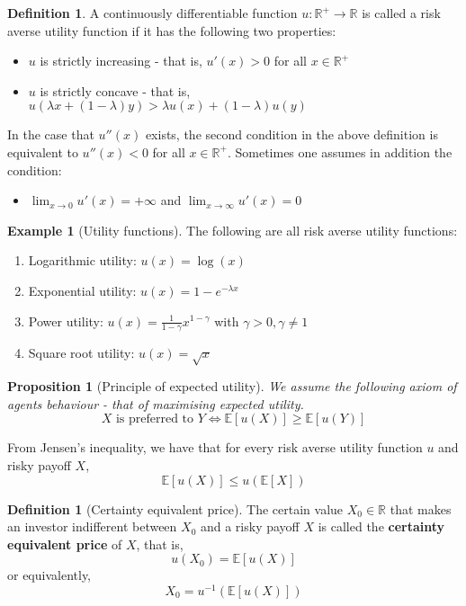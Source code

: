 \documentclass[10pt, oneside, reqno]{amsart}
\theoremstyle{plain}%
\newtheorem{prop}[thm]{Proposition}
\theoremstyle{definition}
\newtheorem{defn}[thm]{Definition}
\newtheorem{exmp}[thm]{Example}
\theoremstyle{remark}
\newcommand{\expc}[1]{\mathbb{E}\left[#1\right]}
\newcommand{\R}{\mathbb{R}}
\begin{document}
\begin{defn}A continuously differentiable function $u: \R^+ \rightarrow \R$ is called a risk averse utility function if it has the following two properties:
    \begin{itemize}
        \item $u$ is strictly increasing - that is, $u'(x) > 0$ for all $x \in \R^+$
        \item $u$ is strictly concave - that is, $u(\lambda x + (1-\lambda)y) > \lambda u(x) + (1-\lambda)u(y)$
    \end{itemize}
        In the case that $u''(x)$ exists, the second condition in the above definition is equivalent to $u''(x) < 0$ for all $x \in \R^+$.  Sometimes one assumes in addition the condition:
        \begin{itemize}
            \item $\lim_{x \rightarrow 0} u'(x) = +\infty$ and $\lim_{x \rightarrow \infty} u'(x) = 0$
        \end{itemize}
\end{defn}


\begin{exmp}[Utility functions]
    The following are all risk averse utility functions:
    \begin{enumerate}
        \item Logarithmic utility: $u(x) = \log(x)$
        \item Exponential utility: $u(x) = 1 - e^{-\lambda x}$
        \item Power utility: $u(x) = \frac{1}{1- \gamma}x^{1-\gamma}$ with $\gamma > 0, \gamma \neq 1$
        \item Square root utility: $u(x) = \sqrt{x}$
    \end{enumerate}
\end{exmp}

\begin{prop}[Principle of expected utility]
    We assume the following axiom of agents behaviour - that of maximising expected utility.\[
        X \text{ is preferred to } Y \iff \expc{u(X)} \geq \expc{u(Y)}
    \]
\end{prop}

From Jensen's inequality, we have that for every risk averse utility function $u$ and risky payoff $X$, \[
    \expc{u(X)} \leq u(\expc{X})
\]

\begin{defn}[Certainty equivalent price]
    The certain value $X_0 \in \R$ that makes an investor indifferent between $X_0$ and a risky payoff $X$ is called the \textbf{certainty equivalent price} of $X$, that is, \[
        u(X_0) = \expc{u(X)}
    \] or equivalently, \[
        X_0 = u^{-1} \left(\expc{u(X)}\right)
    \]
\end{defn}
\end{document}
